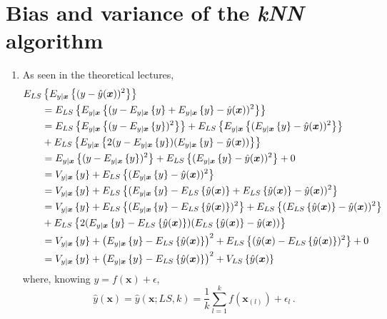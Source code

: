 \documentclass[a4paper, 12pt]{article}
\begin{document}
	\section{Bias and variance of the \emph{kNN} algorithm}\label{sec:bias_variance_knn}
	\begin{enumerate}[label = (\alph*)]
	    \item As seen in the theoretical lectures,
	    \begin{align*}
	       E_{LS} & \left\{E_{y \mid \bm{x}}\left\{(y - \hat{y}(\bm{x}))^2\right\}\right\} \\
	       & = E_{LS}\left\{E_{y \mid \bm{x}}\left\{(y - E_{y \mid \bm{x}}\left\{y\right\} + E_{y \mid \bm{x}}\left\{y\right\} - \hat{y}(\bm{x}))^2\right\}\right\} \\
	       & = E_{LS}\left\{E_{y \mid \bm{x}}\left\{(y - E_{y \mid \bm{x}}\left\{y\right\})^2\right\}\right\} + E_{LS}\left\{E_{y \mid \bm{x}}\left\{(E_{y \mid \bm{x}}\left\{y\right\} - \hat{y}(\bm{x}))^2\right\}\right\} \\
	       & + E_{LS}\left\{E_{y \mid \bm{x}}\left\{2(y-E_{y \mid \bm{x}}\left\{y\right\})(E_{y \mid \bm{x}}\left\{y\right\}- \hat{y}(\bm{x}))\right\}\right\} \\ 
	       & = E_{y \mid \bm{x}}\left\{(y - E_{y \mid \bm{x}}\left\{y\right\})^2\right\} + E_{LS}\left\{(E_{y \mid \bm{x}}\left\{y\right\} - \hat{y}(\bm{x}))^2\right\} + 0 \\
	       & = V_{y \mid \bm{x}} \left\{y\right\} + E_{LS}\left\{(E_{y \mid \bm{x}}\left\{y\right\} - \hat{y}(\bm{x}))^2\right\} \\
	       & = V_{y \mid \bm{x}} \left\{y\right\} + E_{LS}\left\{(E_{y \mid \bm{x}}\left\{y\right\} - E_{LS} \left\{\hat{y}(\bm{x})\right\} + E_{LS} \left\{\hat{y}(\bm{x})\right\} - \hat{y}(\bm{x}))^2\right\} \\
	       & = V_{y \mid \bm{x}} \left\{y\right\} + E_{LS}\left\{(E_{y \mid \bm{x}}\left\{y\right\} - E_{LS} \left\{\hat{y}(\bm{x})\right\})^2\right\} + E_{LS}\left\{(E_{LS} \left\{\hat{y}(\bm{x})\right\} - \hat{y}(\bm{x}))^2\right\} \\
	       & + E_{LS}\left\{2 (E_{y \mid \bm{x}}\left\{y\right\} - E_{LS} \left\{\hat{y}(\bm{x})\right\})(E_{LS} \left\{\hat{y}(\bm{x})\right\} - \hat{y}(\bm{x}))\right\} \\
	       & = V_{y \mid \bm{x}} \left\{y\right\} + \left(E_{y \mid \bm{x}}\left\{y\right\} - E_{LS} \left\{\hat{y}(\bm{x})\right\}\right)^2 + E_{LS}\left\{(\hat{y}(\bm{x}) - E_{LS} \left\{\hat{y}(\bm{x})\right\})^2\right\} + 0 \\
	       & = V_{y \mid \bm{x}} \left\{y\right\} + \left(E_{y \mid \bm{x}} \left\{y\right\} - E_{LS} \left\{\hat{y}(\bm{x})\right\}\right)^2 + V_{LS} \left\{\hat{y}(\bm{x})\right\}
	    \end{align*}
	    where, knowing $y = f(\bm{x}) + \epsilon$,
	    $$\hat{y}(\bm{x}) = \hat{y}(\bm{x}; LS, k) = \frac{1}{k} \sum_{l = 1}^{k} f(\bm{x}_{(l)}) + \epsilon_l \, .$$

\end{enumerate}
\end{document}
